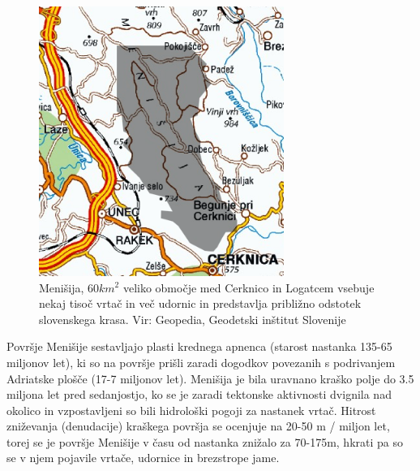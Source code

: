\documentclass[a4paper, oneside, 12pt]{book}
\begin{document}
  \begin{figure}[H]
    \centering
    \includegraphics[width=8cm]{slike/menisija-karta}
    \caption{Menišija, $60 km^2$ veliko območje med Cerknico in Logatcem vsebuje nekaj tisoč vrtač in več udornic in predstavlja približno odstotek slovenskega krasa. Vir: Geopedia, Geodetski inštitut Slovenije}
    \label{fig:menisija-karta}
  \end{figure}

  Površje Menišije sestavljajo plasti krednega apnenca (starost nastanka 135-65 miljonov let), ki so na površje prišli zaradi dogodkov povezanih s podrivanjem Adriatske plošče (17-7 miljonov let). Menišija je bila uravnano kraško polje do 3.5 miljona let pred sedanjostjo, ko se je zaradi tektonske aktivnosti dvignila nad okolico in vzpostavljeni so bili hidrološki pogoji za nastanek vrtač. Hitrost zniževanja (denudacije) kraškega površja se ocenjuje na 20-50 m / miljon let, torej se je površje Menišije v času od nastanka znižalo za 70-175m, hkrati pa so se v njem pojavile vrtače, udornice in brezstrope jame. \cite{Vrabec2006} \cite{Placer2010}
\end{document}
